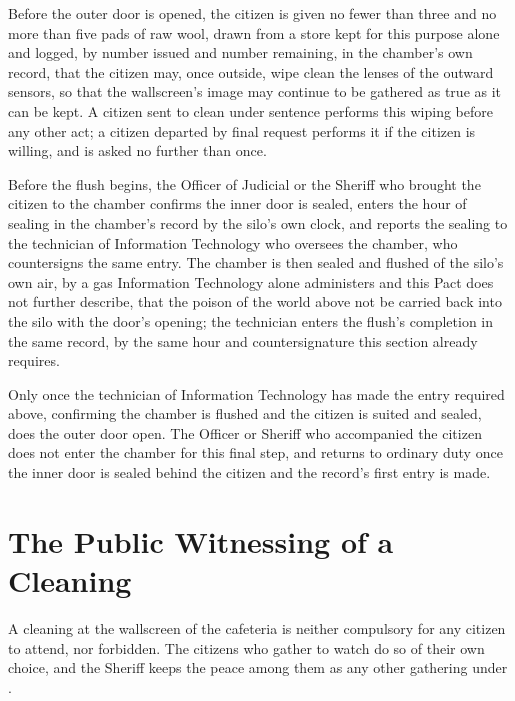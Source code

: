 \begin{clauses}
\item Before the outer door is opened, the citizen is given no fewer than three and no more than five pads of raw wool, drawn from a store kept for this purpose alone and logged, by number issued and number remaining, in the chamber's own record, that the citizen may, once outside, wipe clean the lenses of the outward sensors, so that the wallscreen's image may continue to be gathered as true as it can be kept. A citizen sent to clean under sentence performs this wiping before any other act; a citizen departed by final request performs it if the citizen is willing, and is asked no further than once.
\item Before the flush begins, the Officer of Judicial or the Sheriff who brought the citizen to the chamber confirms the inner door is sealed, enters the hour of sealing in the chamber's record by the silo's own clock, and reports the sealing to the technician of Information Technology who oversees the chamber, who countersigns the same entry. The chamber is then sealed and flushed of the silo's own air, by a gas Information Technology alone administers and this Pact does not further describe, that the poison of the world above not be carried back into the silo with the door's opening; the technician enters the flush's completion in the same record, by the same hour and countersignature this section already requires.
\item Only once the technician of Information Technology has made the entry required above, confirming the chamber is flushed and the citizen is suited and sealed, does the outer door open. The Officer or Sheriff who accompanied the citizen does not enter the chamber for this final step, and returns to ordinary duty once the inner door is sealed behind the citizen and the record's first entry is made.
\end{clauses}

\section{The Public Witnessing of a Cleaning}
\label{sec:cleaning:public-witnessing-of-a-cleaning}

A cleaning at the wallscreen of the cafeteria is neither compulsory for any citizen to attend, nor forbidden. The citizens who gather to watch do so of their own choice, and the Sheriff keeps the peace among them as any other gathering under .

